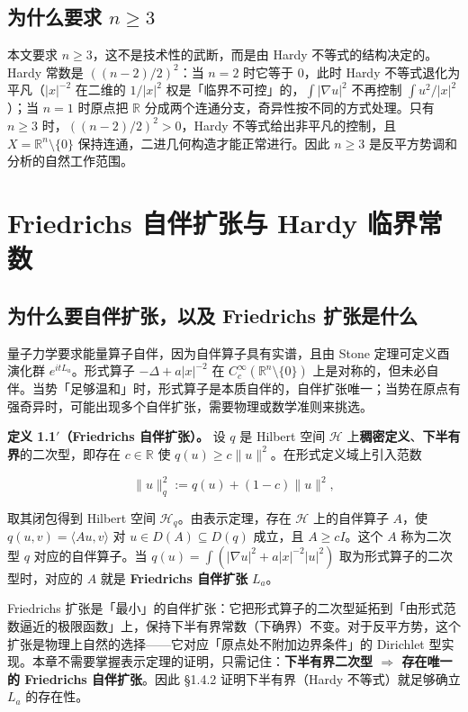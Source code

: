 \documentclass[a4paper,11pt,openany]{ctexbook}
\numberwithin{equation}{chapter}
\numberwithin{figure}{chapter}
\numberwithin{table}{chapter}
\begin{document}
\subsection{为什么要求 $n\ge 3$}

本文要求 $n\ge 3$，这不是技术性的武断，而是由 Hardy 不等式的结构决定的。Hardy 常数是 $((n-2)/2)^2$：当 $n=2$ 时它等于 $0$，此时 Hardy 不等式退化为平凡（$|x|^{-2}$ 在二维的 $1/|x|^2$ 权是「临界不可控」的，$\int|\nabla u|^2$ 不再控制 $\int u^2/|x|^2$）；当 $n=1$ 时原点把 $\mathbb R$ 分成两个连通分支，奇异性按不同的方式处理。只有 $n\ge 3$ 时，$((n-2)/2)^2>0$，Hardy 不等式给出非平凡的控制，且 $X=\mathbb R^n\setminus\{0\}$ 保持连通，二进几何构造才能正常进行。因此 $n\ge 3$ 是反平方势调和分析的自然工作范围。

\section{Friedrichs 自伴扩张与 Hardy 临界常数}

\subsection{为什么要自伴扩张，以及 Friedrichs 扩张是什么}

量子力学要求能量算子自伴，因为自伴算子具有实谱，且由 Stone 定理可定义酉演化群 $e^{itL_a}$。形式算子 $-\Delta+a|x|^{-2}$ 在 $C_c^\infty(\mathbb R^n\setminus\{0\})$ 上是对称的，但未必自伴。当势「足够温和」时，形式算子是本质自伴的，自伴扩张唯一；当势在原点有强奇异时，可能出现多个自伴扩张，需要物理或数学准则来挑选。

\textbf{定义 1.1$'$（Friedrichs 自伴扩张）。} 设 $q$ 是 Hilbert 空间 $\mathcal H$ 上\textbf{稠密定义}、\textbf{下半有界}的二次型，即存在 $c\in\mathbb R$ 使 $q(u)\ge c\|u\|^2$。在形式定义域上引入范数

$$\|u\|_q^2 := q(u)+(1-c)\|u\|^2,$$

取其闭包得到 Hilbert 空间 $\mathcal H_q$。由表示定理，存在 $\mathcal H$ 上的自伴算子 $A$，使 $q(u,v)=\langle Au,v\rangle$ 对 $u\in D(A)\subseteq D(q)$ 成立，且 $A\ge cI$。这个 $A$ 称为二次型 $q$ 对应的自伴算子。当 $q(u)=\int(|\nabla u|^2+a|x|^{-2}|u|^2)$ 取为形式算子的二次型时，对应的 $A$ 就是 \textbf{Friedrichs 自伴扩张} $L_a$。

\begin{intuitionbox}
Friedrichs 扩张是「最小」的自伴扩张：它把形式算子的二次型延拓到「由形式范数逼近的极限函数」上，保持下半有界常数（下确界）不变。对于反平方势，这个扩张是物理上自然的选择——它对应「原点处不附加边界条件」的 Dirichlet 型实现。本章不需要掌握表示定理的证明，只需记住：\textbf{下半有界二次型 $\Rightarrow$ 存在唯一的 Friedrichs 自伴扩张}。因此 §1.4.2 证明下半有界（Hardy 不等式）就足够确立 $L_a$ 的存在性。
\end{intuitionbox}
\end{document}
